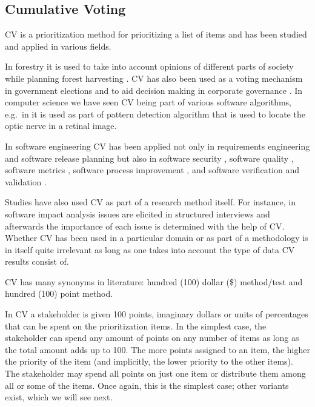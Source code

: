 \subsection{Cumulative Voting\label{app:CV}}

CV is a prioritization method for prioritizing a list of items \cite{Leffingwell1999} and has been studied and applied in various fields.

In forestry it is used to take into account opinions of different parts of society while planning forest harvesting \cite{Laukkanen2004}.
CV has also been used as a voting mechanism in government elections \cite{Cooper2010} and to aid decision making in corporate governance \cite{Bhagat1984}. In computer science we have seen CV being part of various software algorithms, e.g.\ in \cite{Hoover2003} it is used as part of pattern detection algorithm that is used to locate the optic nerve in a retinal image.

In software engineering CV has been applied not only in requirements engineering and software release planning \cite{Heikkila2010}
but also in software security \cite{Baca2010}, software quality \cite{Barney2009b}, software metrics \cite{Berander2006}, software process improvement \cite{Pettersson2008}, and software verification and validation \cite{Feldt2010}.

Studies have also used CV as part of a research method itself. For instance, in \cite{Svahnberg2008} software impact analysis issues are elicited in structured interviews and afterwards the importance of each issue is determined with the help of CV. Whether CV has been used in a particular domain or as part of a methodology is in itself quite irrelevant as long as one takes into account the type of data CV results consist of.

CV has many synonyms in literature: hundred (100) dollar (\$) method\slash test and hundred (100) point method.

In CV a stakeholder is given 100 points,
imaginary dollars or units of percentages that can be spent on the prioritization
items. In the simplest case, the stakeholder can spend any amount of points on any number
of items as long as the total amount adds up to 100. The more points
assigned to an item, the higher the priority of the item (and implicitly, 
the lower priority to the other items). 
The stakeholder may spend all points on just one item or distribute
them among all or some of the items. Once again, this is the simplest case; 
other variants exist, which we will see next.

